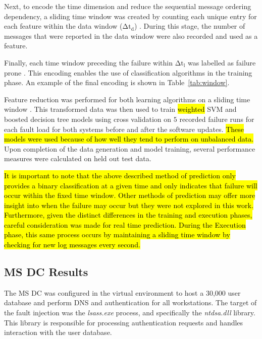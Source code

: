 Next, to encode the time dimension and reduce the sequential message ordering
dependency, a sliding time window was created by counting each unique entry for
each feature within the data window ($\mathrm{\Delta t_d}$)
\citep{vaarandi2002}.  During this stage, the number of messages that were
reported in the data window were also recorded and used as a feature.

Finally, each time window preceding the failure within $\mathrm{\Delta t_l}$
was labelled as failure prone \citep{irrera2015}.  This encoding enables the
use of classification algorithms in the training phase.  An example of the
final encoding is shown in Table~\ref{tab:window}.

\tabMessageIDs %
\tabSlidingWindow

Feature reduction was performed for both learning algorithms on a sliding time
window \citep{fulp2008,irrera2013a,vaarandi2002}.  This transformed data was
then used to train \hl{weighted} \ac{SVM} and boosted decision tree models
using cross validation on $5$ recorded failure runs for each fault load for
both systems before and after the software updates.  \hl{These models were used
because of how well they tend to perform on unbalanced data.} Upon completion
of the data generation and model training, several performance measures were
calculated on held out test data.

\hl{It is important to note that the above described method of prediction only
provides a binary classification at a given time and only indicates that
failure will occur within the fixed time window.  Other methods of prediction
may offer more insight into when the failure may occur but they were not
explored in this work.  Furthermore, given the distinct differences in the
training and execution phases, careful consideration was made for real time
prediction.  During the Execution phase, this same process occurs by
maintaining a sliding time window by checking for new log messages every
second.}

\subsection{\acrfull{MS} \acrfull{DC} Results}
The \ac{MS} \ac{DC} was configured in the virtual environment to host a
30,000 user database and perform \ac{DNS} and authentication for all
workstations.  The target of the fault injection was the \emph{lsass.exe}
process, and specifically the \emph{ntdsa.dll} library.  This library is
responsible for processing authentication requests and handles interaction with
the user database.


